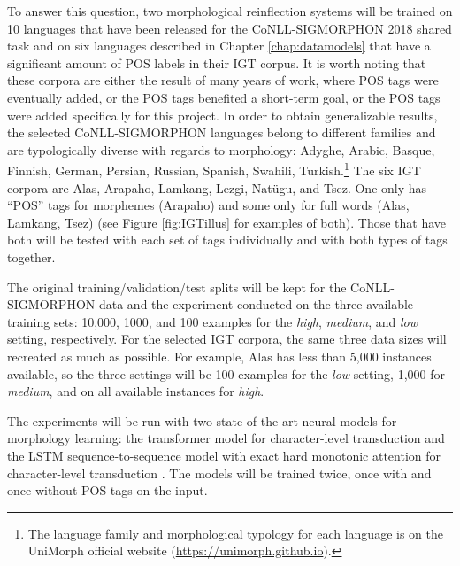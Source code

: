 To answer this question, two morphological reinflection systems will be trained on 10 languages that have been released for the CoNLL-SIGMORPHON 2018 shared task \citep{cotterell-etal-2018-conll} and on six languages described in Chapter \ref{chap:datamodels} that have a significant amount of POS labels in their IGT corpus. It is worth noting that these corpora are either the result of many years of work, where POS tags were eventually added, or the POS tags benefited a short-term goal, or the POS tags were added specifically for this project. In order to obtain generalizable results, the selected CoNLL-SIGMORPHON languages belong to different families and are typologically diverse with regards to morphology: Adyghe, Arabic, Basque, Finnish, German, Persian, Russian, Spanish, Swahili, Turkish.\footnote{The language family and morphological typology for each language is on the UniMorph official website (\url{https://unimorph.github.io}).} The six IGT corpora are Alas, Arapaho, Lamkang, Lezgi, Natügu, and Tsez. One only has ``POS'' tags for morphemes (Arapaho) and some only for full words (Alas, Lamkang, Tsez) (see Figure \ref{fig:IGTillus} for examples of both). Those that have both will be tested with each set of tags individually and with both types of tags together. 

The original training/validation/test splits will be kept for the CoNLL-SIGMORPHON data and the experiment conducted on the three available training sets: 10,000, 1000, and 100 examples for the \textit{high}, \textit{medium}, and \textit{low} setting, respectively. For the selected IGT corpora, the same three data sizes will recreated as much as possible. For example, Alas has less than 5,000 instances available, so the three settings will be 100 examples for the \textit{low} setting, 1,000 for \textit{medium}, and on all available instances for \textit{high}.  

The experiments will be run with two state-of-the-art neural models for morphology learning: the transformer model for character-level transduction \citep{wu2020applying} and the LSTM sequence-to-sequence model with exact hard monotonic attention for character-level transduction \citep{wu-cotterell-2019-exact}.
The models will be trained twice, once with and once without POS tags on the input. 

